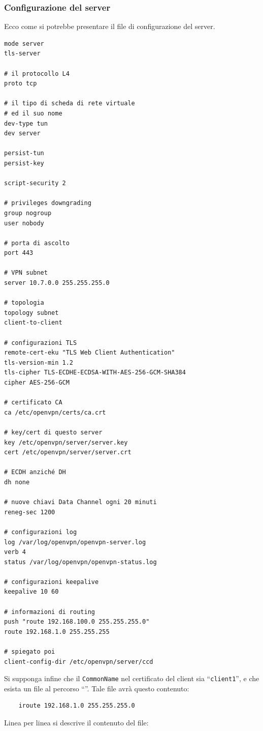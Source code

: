 \subsubsection{Configurazione del server}
Ecco come si potrebbe presentare
il file di configurazione del server.
\begin{verbatim}
mode server
tls-server
	
# il protocollo L4
proto tcp
	
# il tipo di scheda di rete virtuale
# ed il suo nome
dev-type tun
dev server
	
persist-tun
persist-key

script-security 2
	
# privileges downgrading
group nogroup
user nobody
	
# porta di ascolto
port 443
	
# VPN subnet
server 10.7.0.0 255.255.255.0
	
# topologia
topology subnet
client-to-client
	
# configurazioni TLS
remote-cert-eku "TLS Web Client Authentication"
tls-version-min 1.2
tls-cipher TLS-ECDHE-ECDSA-WITH-AES-256-GCM-SHA384
cipher AES-256-GCM
	
# certificato CA
ca /etc/openvpn/certs/ca.crt
	
# key/cert di questo server
key /etc/openvpn/server/server.key
cert /etc/openvpn/server/server.crt
	
# ECDH anziché DH
dh none
	
# nuove chiavi Data Channel ogni 20 minuti
reneg-sec 1200
	
# configurazioni log
log /var/log/openvpn/openvpn-server.log
verb 4
status /var/log/openvpn/openvpn-status.log
	
# configurazioni keepalive
keepalive 10 60
	
# informazioni di routing
push "route 192.168.100.0 255.255.255.0"
route 192.168.1.0 255.255.255
	
# spiegato poi
client-config-dir /etc/openvpn/server/ccd
\end{verbatim}
Si supponga infine che il \texttt{CommonName} nel certificato del client sia
``\texttt{client1}'', e che esista un file al percorso
``''. Tale file avrà questo contenuto:
\begin{verbatim}
	iroute 192.168.1.0 255.255.255.0
\end{verbatim}
Linea per linea si descrive il contenuto del file:
